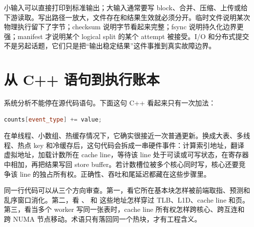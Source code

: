 小输入可以直接打印到标准输出；大输入通常要写 block、合并、压缩、上传或给下游读取。写出路径一放大，文件存在和结果生效就必须分开。临时文件说明某次物理执行留下了字节；checksum 说明字节看起来完整；fsync 说明持久化边界更强；manifest 才说明某个 logical split 的某个 attempt 被接受。I/O 和分布式提交不是另起话题，它们只是把“输出稳定结果”这件事推到真实故障边界。

\section{从 C++ 语句到执行账本}

系统分析不能停在源代码语句。下面这句 C++ 看起来只有一次加法：

\begin{lstlisting}[language=C++,caption={源代码里的聚合更新}]
counts[event_type] += value;
\end{lstlisting}

在单线程、小数组、热缓存情况下，它确实很接近一次普通更新。换成大表、多线程、热点 key 和冷缓存后，这句代码会拆成一串硬件事件：计算索引地址，翻译虚拟地址，加载计数所在 cache line，等待该 line 处于可读或可写状态，在寄存器中相加，再把结果写回 store buffer。若计数槽位被多个核心同时写，核心还要竞争该 line 的独占所有权。正确性、吞吐和尾延迟都藏在这些步骤里。

同一行代码可以从三个方向审查。第一，看它所在基本块怎样被前端取指、预测和乱序窗口消化。第二，看 、 和  这些地址怎样穿过 TLB、L1D、cache line 和页。第三，看当多个 worker 写同一张表时，cache line 所有权怎样跨核心、跨互连和跨 NUMA 节点移动。术语只有落回同一个热块，才有工程含义。

